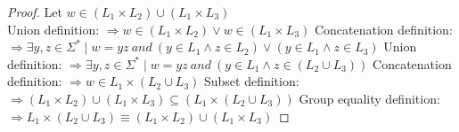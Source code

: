\documentclass{article}
\begin{document}
\begin{proof}
  Let $w \in (L_1 \times L_2) \cup (L_1 \times L_3)$ \newline
\\
Union definition: \newline
  $\Longrightarrow w \in (L_1 \times L_2) \vee w \in (L_1 \times L_3)$ \newline
Concatenation definition: \newline
  $\Longrightarrow \exists y,z \in \Sigma^{*} \mid w = yz ~and~ (y \in L_1 \wedge z \in L_2) \vee (y \in L_1 \wedge z \in L_3)$ \newline
Union definition: \newline
  $\Longrightarrow \exists y,z \in \Sigma^{*} \mid w = yz ~and~ (y \in L_1 \wedge z \in (L_2 \cup L_3))$ \newline
Concatenation definition: \newline
  $\Longrightarrow w \in L_1 \times (L_2 \cup L_3)$ \newline
Subset definition: \newline
  $\Longrightarrow (L_1 \times L_2) \cup (L_1 \times L_3) \subseteq (L_1 \times (L_2 \cup L_3))$ \newline
Group equality definition: \newline
$\Longrightarrow L_1 \times (L_2 \cup L_3) \equiv (L_1 \times L_2) \cup (L_1 \times L_3)$ \newline

\end{proof}
\end{document}
